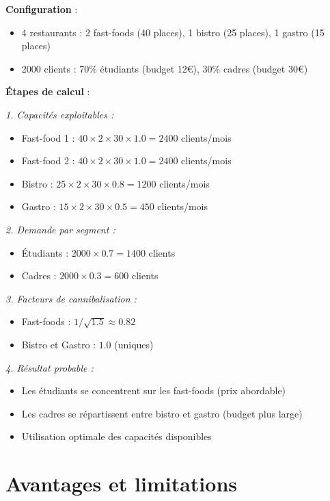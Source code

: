 \documentclass[12pt,a4paper]{article}
\begin{document}
\textbf{Configuration} :
\begin{itemize}
    \item 4 restaurants : 2 fast-foods (40 places), 1 bistro (25 places), 1 gastro (15 places)
    \item 2000 clients : 70\% étudiants (budget 12€), 30\% cadres (budget 30€)
\end{itemize}

\textbf{Étapes de calcul} :

\textit{1. Capacités exploitables :}
\begin{itemize}
    \item Fast-food 1 : $40 \times 2 \times 30 \times 1.0 = 2400$ clients/mois
    \item Fast-food 2 : $40 \times 2 \times 30 \times 1.0 = 2400$ clients/mois
    \item Bistro : $25 \times 2 \times 30 \times 0.8 = 1200$ clients/mois
    \item Gastro : $15 \times 2 \times 30 \times 0.5 = 450$ clients/mois
\end{itemize}

\textit{2. Demande par segment :}
\begin{itemize}
    \item Étudiants : $2000 \times 0.7 = 1400$ clients
    \item Cadres : $2000 \times 0.3 = 600$ clients
\end{itemize}

\textit{3. Facteurs de cannibalisation :}
\begin{itemize}
    \item Fast-foods : $1/\sqrt{1.5} \approx 0.82$
    \item Bistro et Gastro : $1.0$ (uniques)
\end{itemize}

\textit{4. Résultat probable :}
\begin{itemize}
    \item Les étudiants se concentrent sur les fast-foods (prix abordable)
    \item Les cadres se répartissent entre bistro et gastro (budget plus large)
    \item Utilisation optimale des capacités disponibles
\end{itemize}

\section{Avantages et limitations}
\end{document}
